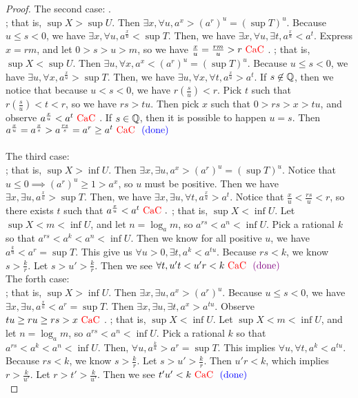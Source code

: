 \documentclass{report}
\begin{document}
\begin{proof}
  The second case: .\\

  ; that is, $\sup X>\sup U$. Then $\exists x,\forall u, a^x>(a^r)^u=(\sup T)^u$. Because $u\leq s<0$, we have $\exists x,\forall u,a^{\frac{x}{u}}<\sup T$. Then, we have $\exists x,\forall u,\exists t,a^{\frac{x}{u}}<a^t$. Express $x=rm$, and let $0>s>u>m$, so we have  $\frac{x}{u}=\frac{rm}{u}>r\text{ \textcolor{red}{CaC} }$. ; that is, $\sup X<\sup U$. Then $\exists u,\forall x,a^x<(a^r)^u=(\sup T)^u$. Because $u\leq s<0$, we have $\exists u,\forall x, a^{\frac{x}{u}}>\sup T$. Then, we have $\exists u,\forall x,\forall t, a^{\frac{x}{u}}>a^t$. If $s\not\in\mathbb{Q}$, then we notice that because $u<s<0$, we have $r(\frac{s}{u})<r$. Pick $t$ such that $r(\frac{s}{u})<t<r$, so we have $rs>tu$. Then pick $x$ such that $0>rs>x>tu$, and observe $a^{\frac{x}{u}}<a^t\text{ \textcolor{red}{CaC} }$. If $s\in\mathbb{Q}$, then it is possible to happen $u=s$. Then $a^{\frac{x}{u}}=a^{\frac{x}{s}}>a^{\frac{rs}{s}}=a^r\geq a^t\text{ \textcolor{red}{CaC} }\textcolor{blue}{\text{ (done) }}$  \\



  \\




The third case: \\

; that is, $\sup X>\inf  U$. Then $\exists x,\exists u,a^x>(a^r)^u=(\sup T)^u $. Notice that $u\leq 0\implies (a^r)^u\geq 1>a^x$, so $u$ must be positive. Then we have $\exists x,\exists u,a^{\frac{x}{u}}>\sup T$. Then, we have $\exists x,\exists u,\forall t,a^{\frac{x}{u}}>a^t$. Notice that $\frac{x}{u}<\frac{rs}{u}<r$, so there  exists $t$ such that  $a^{\frac{x}{u}}<a^t\text{ \textcolor{red}{CaC} }.$ ; that is, $\sup X<\inf U$. Let $\sup X<m<\inf U$, and let $n=\log_a m$, so $a^{rs}<a^n<\inf  U$. Pick a rational $k$ so that  $a^{rs}<a^k<a^n<\inf U$. Then we know for all positive $u$, we have $a^{\frac{k}{u}}<a^r=\sup T$. This give us $\forall u>0,\exists t,a^k<a^{tu}$. Because $rs<k$, we know  $s>\frac{k}{r}$. Let $s>u'>\frac{k}{r}$. Then we see $\forall t,u't<u'r<k\text{ \textcolor{red}{CaC} }\textcolor{violet}{\text{ (done) }}$\\

The forth case: \\

; that is, $\sup X>\inf U$. Then $\exists x,\exists u,a^x>(a^r)^u$. Because $u\leq s<0$, we have $\exists x,\exists u, a^{\frac{x}{u}}<a^r=\sup T$. Then $\exists x,\exists u,\exists t, a^x>a^{tu}$. Observe $tu\geq ru\geq rs>x\text{ \textcolor{red}{CaC} }$. ; that is, $\sup X<\inf U$. Let $\sup X<m<\inf U$, and let $n=\log_a m$, so $a^{rs}<a^n<\inf  U$. Pick a rational $k$ so that  $a^{rs}<a^k<a^n<\inf U$. Then, $\forall u, a^{\frac{k}{u}}>a^r=\sup T$. This implies $\forall u,\forall t,a^k<a^{tu}$. Because $rs<k$, we know  $s>\frac{k}{r}$. Let $s>u'>\frac{k}{r}$. Then $u'r<k$, which implies $r>\frac{k}{u'}$. Let $r>t'>\frac{k}{u'}$. Then we see $t'u'<k\text{ \textcolor{red}{CaC} }\textcolor{blue}{\text{ (done) }}$\\


\end{proof}
\end{document}
